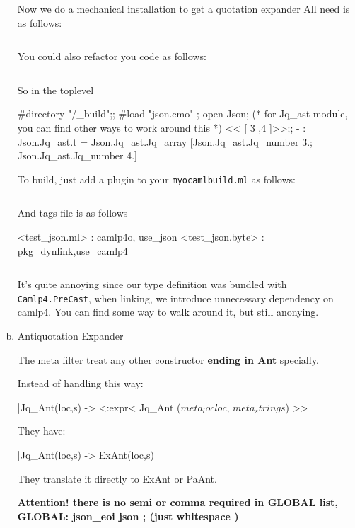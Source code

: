 \begin{enumerate}[(a)]
Now we do a mechanical installation to get a quotation expander 
All need is as follows:
\inputminted[fontsize=\scriptsize, fontsize=\scriptsize, firstline=63,lastline=83]{ocaml}{camlp4/code/jake/json.ml}

You could also refactor you code as follows:

\inputminted[fontsize=\scriptsize, fontsize=\scriptsize, firstline=84,lastline=96]{ocaml}{camlp4/code/jake/json.ml}

So in the toplevel
\begin{ocamlcode}
#directory "/_build";;
#load "json.cmo" ;
open Json;  
(* for Jq_ast module, you can find other ways to work
around this *)
 << [ 3 ,4 ]>>;;
- : Json.Jq_ast.t = Json.Jq_ast.Jq_array [Json.Jq_ast.Jq_number 3.; Json.Jq_ast.Jq_number
4.]
\end{ocamlcode}


To build, just add a plugin to your \verb|myocamlbuild.ml| as follows:

\inputminted[fontsize=\scriptsize, fontsize=\scriptsize, firstline=117,lastline=133]{ocaml}{camlp4/code/jake/myocamlbuild.ml}


And tags file is as follows
\begin{bluetext}
<test_json.ml> : camlp4o, use_json
<test_json.byte> : pkg_dynlink,use_camlp4
\end{bluetext}


\inputminted[fontsize=\scriptsize, fontsize=\scriptsize, ]{ocaml}{camlp4/code/jake/test_json.ml}
It's quite annoying since our type definition was bundled with
\verb|Camlp4.PreCast|, when linking, we introduce unnecessary
dependency on camlp4. You can find some way to walk around it, but
still anonying.


\item Antiquotation Expander


  The meta filter treat any other constructor \textbf{ending in Ant}
specially.


Instead of handling this way:
\begin{ocamlcode}
  |Jq_Ant(loc,s) -> <:expr< Jq_Ant ($meta_loc loc$, $meta_string s$) >>
\end{ocamlcode}


They have:
\begin{ocamlcode}
  |Jq_Ant(loc,s) -> ExAnt(loc,s) 
\end{ocamlcode}
They translate it directly to ExAnt or PaAnt.

\textbf{Attention! there is no semi or comma required in GLOBAL list,
  GLOBAL: json\_eoi  json ; (just whitespace ) }






\end{enumerate}
